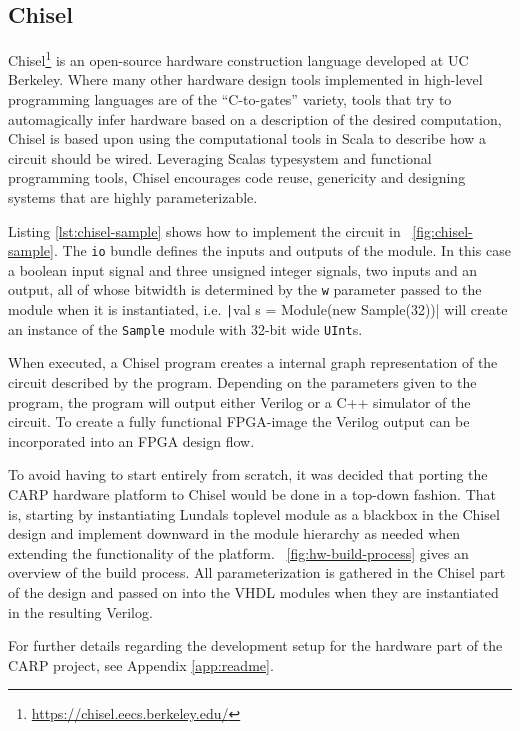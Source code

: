 \subsection{Chisel}
\label{sec:chisel}

Chisel\footnote{\url{https://chisel.eecs.berkeley.edu/}} is an open-source
hardware construction language developed at UC Berkeley. Where many other
hardware design tools implemented in high-level programming languages are of the
``C-to-gates'' variety, tools that try to automagically infer hardware based on
a description of the desired computation, Chisel is based upon using the
computational tools in Scala to describe how a circuit should be wired.
Leveraging Scalas typesystem and functional programming tools, Chisel encourages
code reuse, genericity and designing systems that are highly parameterizable.

Listing \ref{lst:chisel-sample} shows how to implement the circuit in
\figurename~\ref{fig:chisel-sample}. The \texttt{io} bundle defines the inputs
and outputs of the module. In this case a boolean input signal and three
unsigned integer signals, two inputs and an output, all of whose bitwidth is
determined by the \texttt{w} parameter passed to the module when it is
instantiated, i.e. \texttt|val s = Module(new Sample(32))| will
create an instance of the \texttt{Sample} module with 32-bit wide
\texttt{UInt}s.

When executed, a Chisel program creates a internal graph representation of the
circuit described by the program. Depending on the parameters given to the
program, the program will output either Verilog or a C++ simulator of the
circuit. To create a fully functional FPGA-image the Verilog output can be
incorporated into an FPGA design flow.

To avoid having to start entirely from scratch, it was decided that porting the
CARP hardware platform to Chisel would be done in a top-down fashion. That is,
starting by instantiating Lundals toplevel module as a blackbox in the Chisel
design and implement downward in the module hierarchy as needed when extending
the functionality of the platform. \figurename~\ref{fig:hw-build-process} gives
an overview of the build process. All parameterization is gathered in the Chisel
part of the design and passed on into the VHDL modules when they are
instantiated in the resulting Verilog.

For further details regarding the development setup for the hardware part of the
CARP project, see Appendix \ref{app:readme}.

